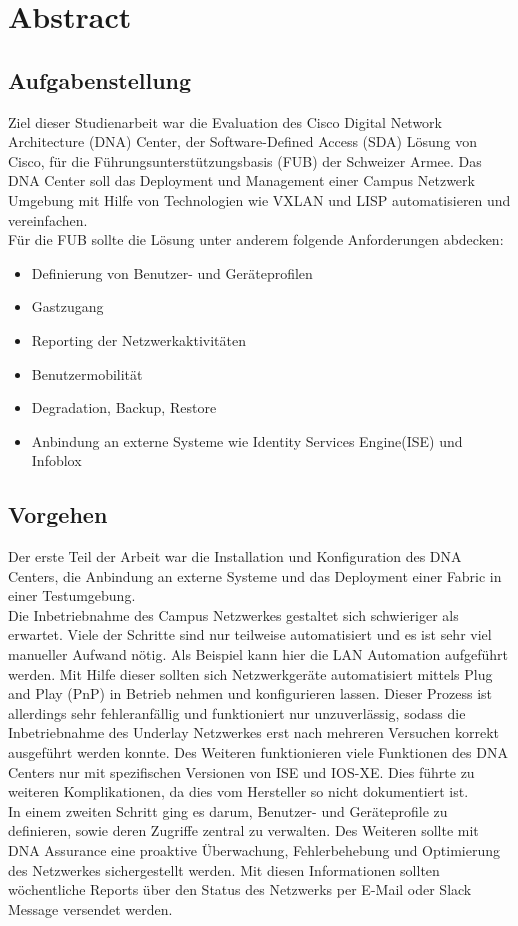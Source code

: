 \section{Abstract}

\subsection{Aufgabenstellung}

Ziel dieser Studienarbeit war die Evaluation des Cisco Digital Network Architecture (DNA) Center, der Software-Defined Access (SDA) Lösung von Cisco, für die Führungsunterstützungsbasis (FUB) der Schweizer Armee. Das DNA Center soll das Deployment und Management einer Campus Netzwerk Umgebung mit Hilfe von Technologien wie VXLAN und LISP automatisieren und vereinfachen.\\
Für die FUB sollte die Lösung unter anderem folgende Anforderungen abdecken:
\begin{itemize}
	\item Definierung von Benutzer- und Geräteprofilen
	\item Gastzugang
	\item Reporting der Netzwerkaktivitäten
	\item Benutzermobilität
	\item Degradation, Backup, Restore
	\item Anbindung an externe Systeme wie Identity Services Engine(ISE) und Infoblox
\end{itemize}

\subsection{Vorgehen}
Der erste Teil der Arbeit war die Installation und Konfiguration des DNA Centers, die Anbindung an externe Systeme und das Deployment einer Fabric in einer Testumgebung.\\
Die Inbetriebnahme des Campus Netzwerkes gestaltet sich schwieriger als erwartet. Viele der Schritte sind nur teilweise automatisiert und es ist sehr viel manueller Aufwand nötig. Als Beispiel kann hier die LAN Automation aufgeführt werden. Mit Hilfe dieser sollten sich Netzwerkgeräte automatisiert mittels Plug and Play (PnP) in Betrieb nehmen und konfigurieren lassen. Dieser Prozess ist allerdings sehr fehleranfällig und funktioniert nur unzuverlässig, sodass die Inbetriebnahme des Underlay Netzwerkes erst nach mehreren Versuchen korrekt ausgeführt werden konnte. 
Des Weiteren funktionieren viele Funktionen des DNA Centers nur mit spezifischen Versionen von ISE und IOS-XE. Dies führte zu weiteren Komplikationen, da dies vom Hersteller so nicht dokumentiert ist. \\
In einem zweiten Schritt ging es darum, Benutzer- und Geräteprofile zu definieren, sowie deren Zugriffe zentral zu verwalten. Des Weiteren sollte mit DNA Assurance eine proaktive Überwachung, Fehlerbehebung und Optimierung des Netzwerkes sichergestellt werden. Mit diesen Informationen sollten wöchentliche Reports über den Status des Netzwerks per E-Mail oder Slack Message versendet werden.
